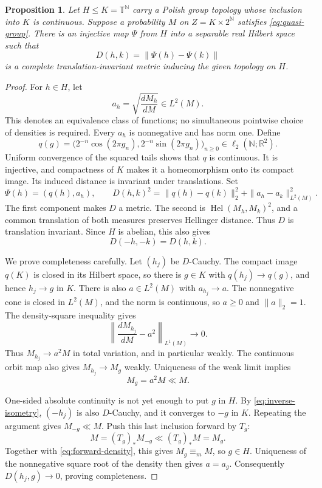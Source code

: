 \documentclass[11pt]{article}
\numberwithin{equation}{section}
\newtheorem{proposition}[theorem]{Proposition}
\theoremstyle{definition}
\newcommand{\N}{\mathbb N}
\newcommand{\R}{\mathbb R}
\newcommand{\T}{\mathbb T}
\newcommand{\ME}{\mathrel{\equiv_m}}
\newcommand{\Hel}{\operatorname{Hel}}
\begin{document}
\begin{proposition}\label{prop:Hilbert-metric}
Let $H\le K=\T^\N$ carry a Polish group topology whose inclusion into
$K$ is continuous. Suppose a probability $M$ on $Z=K\times2^\N$
satisfies \eqref{eq:quasi-group}. There is an injective map $\Psi$ from
$H$ into a separable real Hilbert space such that
\[
 D(h,k)=\|\Psi(h)-\Psi(k)\|
\]
is a complete translation-invariant metric inducing the given topology
on $H$.
\end{proposition}
\begin{proof}
For $h\in H$, let
\[
 a_h=\sqrt{\frac{dM_h}{dM}}\in L^2(M).
\]
This denotes an equivalence class of functions; no simultaneous
pointwise choice of densities is required. Every $a_h$ is nonnegative
and has norm one. Define
\[
 q(g)=\bigl(2^{-n}\cos(2\pi g_n),
             2^{-n}\sin(2\pi g_n)\bigr)_{n\ge0}\in\ell_2(\N;\R^2).
\]
Uniform convergence of the squared tails shows that $q$ is continuous.
It is injective, and compactness of $K$ makes it a homeomorphism onto
its compact image. Its induced distance is invariant under translations.
Set
\[
 \Psi(h)=(q(h),a_h),\qquad
 D(h,k)^2=\|q(h)-q(k)\|_2^2+\|a_h-a_k\|_{L^2(M)}^2.
\]
The first component makes $D$ a metric. The second is
$\Hel(M_h,M_k)^2$, and a common translation of both measures preserves
Hellinger distance. Thus $D$ is translation invariant. Since $H$ is
abelian, this also gives
\begin{equation}\label{eq:inverse-isometry}
 D(-h,-k)=D(h,k).
\end{equation}

We prove completeness carefully. Let $(h_j)$ be $D$-Cauchy. The compact
image $q(K)$ is closed in its Hilbert space, so there is $g\in K$ with
$q(h_j)\to q(g)$, and hence $h_j\to g$ in $K$. There is also
$a\in L^2(M)$ with $a_{h_j}\to a$. The nonnegative cone is closed
in $L^2(M)$, and the norm is continuous, so $a\ge0$ and $\|a\|_2=1$.
The density-square inequality gives
\[
 \left\|\frac{dM_{h_j}}{dM}-a^2\right\|_{L^1(M)}\longrightarrow0.
\]
Thus $M_{h_j}\to a^2M$ in total variation, and in particular weakly.
The continuous orbit map also gives $M_{h_j}\to M_g$ weakly. Uniqueness
of the weak limit implies
\begin{equation}\label{eq:forward-density}
 M_g=a^2M\ll M.
\end{equation}

One-sided absolute continuity is not yet enough to put $g$ in $H$.
By \eqref{eq:inverse-isometry}, $(-h_j)$ is also $D$-Cauchy, and it
converges to $-g$ in $K$. Repeating the argument gives $M_{-g}\ll M$.
Push this last inclusion forward by $T_g$:
\[
 M=(T_g)_*M_{-g}\ll (T_g)_*M=M_g.
\]
Together with \eqref{eq:forward-density}, this gives $M_g\ME M$,
so $g\in H$. Uniqueness of the nonnegative square root of the density
then gives $a=a_g$. Consequently $D(h_j,g)\to0$, proving completeness.


\end{proof}
\end{document}
